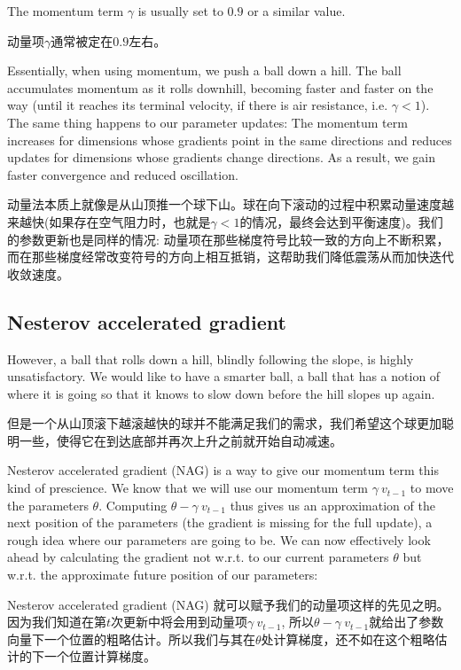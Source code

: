 \documentclass{article}
\begin{document}
The momentum term $\gamma$ is usually set to $0.9$ or a similar value.

动量项$\gamma$通常被定在$0.9$左右。

Essentially, when using momentum, we push a ball down a hill. The ball accumulates momentum as it rolls downhill, becoming faster and faster on the way (until it reaches its terminal velocity, if there is air resistance, i.e. $\gamma < 1$). The same thing happens to our parameter updates: The momentum term increases for dimensions whose gradients point in the same directions and reduces updates for dimensions whose gradients change directions. As a result, we gain faster convergence and reduced oscillation.

动量法本质上就像是从山顶推一个球下山。球在向下滚动的过程中积累动量速度越来越快(如果存在空气阻力时，也就是$\gamma < 1$的情况，最终会达到平衡速度)。我们的参数更新也是同样的情况: 动量项在那些梯度符号比较一致的方向上不断积累，而在那些梯度经常改变符号的方向上相互抵销，这帮助我们降低震荡从而加快迭代收敛速度。

\subsection{Nesterov accelerated gradient}

However, a ball that rolls down a hill, blindly following the slope, is highly unsatisfactory. We would like to have a smarter ball, a ball that has a notion of where it is going so that it knows to slow down before the hill slopes up again.

但是一个从山顶滚下越滚越快的球并不能满足我们的需求，我们希望这个球更加聪明一些，使得它在到达底部并再次上升之前就开始自动减速。

Nesterov accelerated gradient (NAG) \cite{Nesterov} is a way to give our momentum term this kind of prescience. We know that we will use our momentum term $\gamma \: v_{t-1}$ to move the parameters $\theta$. Computing $\theta - \gamma \: v_{t-1}$ thus gives us an approximation of the next position of the parameters (the gradient is missing for the full update), a rough idea where our parameters are going to be. We can now effectively look ahead by calculating the gradient not w.r.t. to our current parameters $\theta$ but w.r.t. the approximate future position of our parameters:

Nesterov accelerated gradient (NAG) \cite{Nesterov} 就可以赋予我们的动量项这样的先见之明。因为我们知道在第$t$次更新中将会用到动量项$\gamma \: v_{t-1}$, 所以$\theta - \gamma \: v_{t-1}$就给出了参数向量下一个位置的粗略估计。所以我们与其在$\theta$处计算梯度，还不如在这个粗略估计的下一个位置计算梯度。
\end{document}
